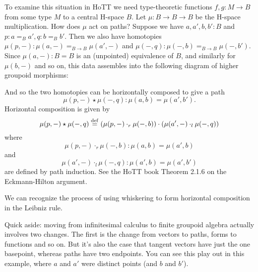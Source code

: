 \documentclass[12pt]{article}
\begin{document}
To examine this situation in HoTT we need type-theoretic functions \( f, g:M\to B \) from some type \( M \) to a central H-space \( B \). Let \( \mu:B\to B\to B \) be the H-space multiplication. How does \( \mu \) act on paths? Suppose we have \( a, a', b, b':B \) and \( p:a=_B a', q:b=_B b' \). Then we also have homotopies \( \mu(p, -):\mu(a, -)=_{B\to B}\mu(a', -) \) and \( \mu(-,q):\mu(-,b)=_{B\to B}\mu(-,b'). \) Since \( \mu(a, -):B=B \) is an (unpointed) equivalence of \( B \), and similarly for \( \mu(b, -) \) and so on, this data assembles into the following diagram of higher groupoid morphisms:

\begin{center}
\end{center}

And so the two homotopies can be horizontally composed to give a path \[ \mu(p,-)\star\mu(-,q): \mu(a, b)=\mu(a',b'). \] Horizontal composition is given by \[\mu(p,-)\star\mu(-,q)\stackrel{\mathrm{def}}{=}(\mu(p,-)\cdot_r \mu(-,b))\cdot(\mu(a', -)\cdot_l\mu(-, q))\] where \[ \mu(p,-)\cdot_r\mu(-,b):\mu(a,b)=\mu(a',b) \] and \[ \mu(a',-)\cdot_l\mu(-,q):\mu(a',b)=\mu(a',b') \] are defined by path induction.  See the HoTT book Theorem 2.1.6 on the Eckmann-Hilton argument\cite{hottbook}.

We can recognize the process of using whiskering to form horizontal composition in the Leibniz rule. 

Quick aside: moving from infinitesimal calculus to finite groupoid algebra actually involves two changes. The first is the change from vectors to paths, forms to functions and so on. But it's also the case that tangent vectors have just the one basepoint, whereas paths have two endpoints. You can see this play out in this example, where \( a \) and \( a' \) were distinct points (and \( b \) and \( b' \)).
\end{document}
